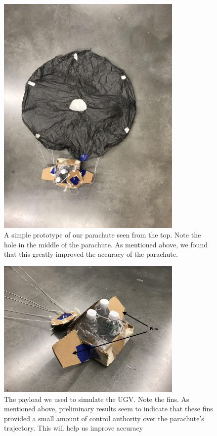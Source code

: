 \documentclass[]{auvsi_doc}
\begin{document}
\begin{figure}[ht]
\centering
\includegraphics[width=90mm]{./figs/Parachute_Top.jpg}
\caption{A simple prototype of our parachute seen from the top. Note the hole in the middle of the parachute. As mentioned above, we found that this greatly improved the accuracy of the parachute. \label{overflow}}
\end{figure}

\begin{figure}[ht]
\centering
\includegraphics[width=90mm]{./figs/Parachute_Fins.jpg}
\caption{The payload we used to simulate the UGV. Note the fins. As mentioned above, preliminary results seem to indicate that these fins provided a small amount of control authority over the parachute's trajectory. This will help us improve accuracy \label{overflow}}
\end{figure}
\end{document}
